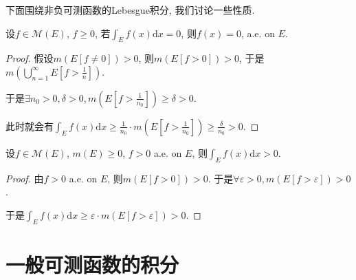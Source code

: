 \documentclass[theorem=false,mathfont=none,openany,sub3section]{easybook}
\begin{document}
下面围绕非负可测函数的Lebesgue积分, 我们讨论一些性质.\par

\begin{corollary}
  设$f\in \mathcal{M} (E)$, $f\geqslant 0$, 若$\int_{E}f(x)\mathrm{d}x=0$, 则$f(x)=0$, a.e. on $E$.\par
\end{corollary}

\begin{proof}
  假设$m(E[f\ne 0])>0$, 则$m(E[f> 0])>0$, 于是$m(\bigcup_{n=1}^{\infty}E[f>\frac{1}{n}])$.\par
  于是$\exists n_0>0, \delta>0, m(E[f>\frac{1}{n_0}])\geqslant \delta>0$.\par
  此时就会有$\int_{E}f(x)\mathrm{d}x\geqslant \frac{1}{n_0}\cdot m(E[f>\frac{1}{n_0}])\geqslant \frac{\delta}{n_0}>0$.\par 
\end{proof}

\begin{corollary}
  设$f\in \mathcal{M} (E)$, $m(E)\geqslant 0$, $f>0$ a.e. on $E$, 则$\int_{E}f(x)\mathrm{d}x>0$.\par
\end{corollary}

\begin{proof}
  由$f>0$ a.e. on $E$, 则$m(E[f>0])>0$. 于是$\forall \varepsilon >0, m(E[f>\varepsilon])>0$.\par
  于是$\int_{E}f(x)\mathrm{d}x\geqslant \varepsilon\cdot m(E[f>\varepsilon])>0$.\par
\end{proof}


\newpage

\section{一般可测函数的积分}


\backmatter
\end{document}
